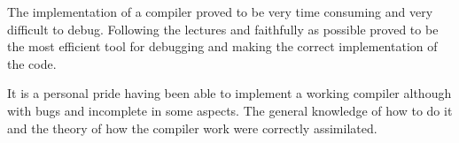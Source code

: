 \documentclass[conference]{IEEEtran}
\theoremstyle{definition}
\begin{document}
The implementation of a compiler proved to be very time consuming and very difficult to debug. Following the lectures and faithfully as possible proved to be the most efficient tool for debugging and making the correct implementation of the code.

It is a personal pride having been able to implement a working compiler although with bugs and incomplete in some aspects. The general knowledge of how to do it and the theory of how the compiler work were correctly assimilated.


\newpage
{}


\end{document}
